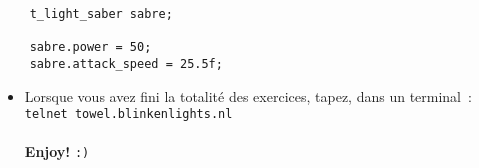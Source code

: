 \documentclass{koala-en}
\begin{document}
\begin{lstlisting}
	t_light_saber sabre;

	sabre.power = 50;
	sabre.attack_speed = 25.5f;
\end{lstlisting}

\begin{itemize}
		\item	Lorsque vous avez fini la totalité des exercices, tapez, dans un terminal~:\\
			\lstinline$telnet towel.blinkenlights.nl$\\\\
			\textbf{Enjoy!} \texttt{:)}
\end{itemize}
\thispagestyle{fancy}
\end{document}
